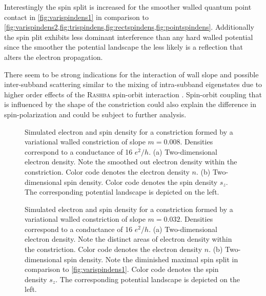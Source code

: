 Interestingly the spin split is increased for the smoother walled quantum point contact in \cref{fig:varispindens1} in comparison to \cref{fig:varispindens2,fig:trispindens,fig:rectspindens,fig:pointspindens}. Additionally the spin plit exhibits less dominant interference than any hard walled potential since the smoother the potential landscape the less likely is a reflection that alters the electron propagation.\par
There seem to be strong indications for the interaction of wall slope and possible inter-subband scattering similar to the mixing of intra-subband eigenstates due to higher order effects of the \textsc{Rashba} spin-orbit interaction \cite{Wolfgang2003PhysicaE.18.337}. Spin-orbit coupling that is influenced by the shape of the constriction could also explain the difference in spin-polarization and could be subject to further analysis.
\begin{figure}[h]
  \caption{Simulated electron and spin density for a constriction formed by a variational walled constriction of slope $m=0.008$. Densities correspond to a conductance of 16 $e^2/h$. (a) Two-dimensional electron density. Note the smoothed out electron density within the constriction. Color code denotes the electron density $n$. (b) Two-dimensional spin density. Color code denotes the spin density $s_z$. The corresponding potential landscape is depicted on the left.}
\end{figure}
\begin{figure}[h]
\caption{Simulated electron and spin density for a constriction formed by a variational walled constriction of slope $m=0.032$. Densities correspond to a conductance of 16 $e^2/h$. (a) Two-dimensional electron density. Note the distinct areas of electron density within the constriction. Color code denotes the electron density $n$. (b) Two-dimensional spin density. Note the diminished maximal spin split in comparison to \cref{fig:varispindens1}. Color code denotes the spin density $s_z$. The corresponding potential landscape is depicted on the left.}
\end{figure}
\FloatBarrier
